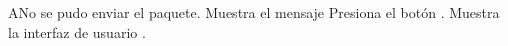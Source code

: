 \label{SP2-CU5-A}
\begin{UCtrayectoriaA}{A}{No se pudo enviar el paquete.}
    \UCpaso Muestra el mensaje 
    \UCpaso[\UCactor] Presiona el botón .
    \UCpaso Muestra la interfaz de usuario .
\end{UCtrayectoriaA}
